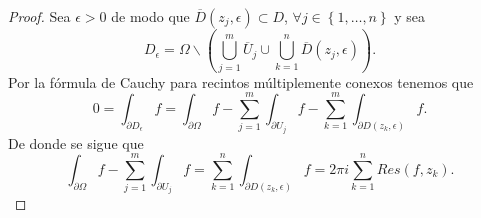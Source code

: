 \begin{proof}
	Sea $\displaystyle \epsilon > 0 $ de modo que $\displaystyle \overline{D}\left(z_{j}, \epsilon \right)\subset D $, $\displaystyle \forall j \in \left\{ 1, \ldots, n\right\}  $ y sea
	\[D_{\epsilon }=\Omega \backslash \left(\bigcup_{j = 1}^{m}\overline{U}_{j}\cup \bigcup_{k = 1}^{n}\overline{D}\left(z_{j}, \epsilon \right)\right) .\]
	Por la fórmula de Cauchy para recintos múltiplemente conexos tenemos que 
	\[0 = \int _{\partial D_{\epsilon }} f = \int _{\partial \Omega }f -\sum^{m}_{j = 1}\int _{\partial U_{j}}f -\sum^{m}_{k = 1}\int _{\partial D\left(z_{k}, \epsilon \right)}f  .\]
	De donde se sigue que
	\[\int _{\partial \Omega }f -\sum^{m}_{j = 1}\int _{\partial U_{j}}f =\sum^{n}_{k = 1}\int _{\partial D\left(z_{k}, \epsilon \right)}f =2\pi i\sum^{n}_{k = 1}Res\left(f, z_{k}\right) .\]
\end{proof}
